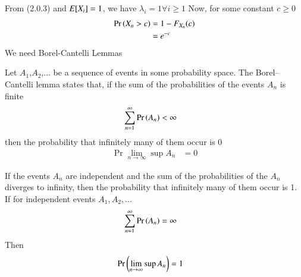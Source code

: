 \documentclass[journal,12pt,twocolumn]{IEEEtran}
\begin{document}
From (2.0.3) and $E[ X_i ]=1$, we have $\lambda_i=1 \forall  i \geq1$
Now, for some constant $c\geq0$
\begin{align}
    \Pr\left(X_n>c\right)&=1-F_{X_n}(c)\\
             &=e^{-c}
\end{align}
We need Borel-Cantelli Lemmas
\begin{lemma}\label{Lemma1}
Let $A_1$,$A_2$,... be a sequence of events in some probability space. The Borel–Cantelli lemma states that, if the sum of the probabilities of the events $A_n$ is finite
\begin{align}
    \sum_{n=1}^{\infty}\Pr\left(A_n\right)&<\infty
\end{align}
then the probability that infinitely many of them occur is 0
\begin{align}
    \Pr{\lim_{n \rightarrow \infty}\sup A_n}&=0
\end{align}
\end{lemma}
\begin{lemma}\label{Lemma2}
If the events $A_n$ are independent and the sum of the probabilities of the $A_n$ diverges to infinity, then the probability that infinitely many of them occur is 1.
If for independent events $A_1,A_2,...$
\begin{align}
    \sum_{n=1}^{\infty}\Pr\left(A_n\right)&=\infty
\end{align}
Then
\begin{align}
    \Pr\left(\lim_{n \rightarrow \infty}\sup A_n\right)&=1
\end{align}
\end{lemma}
\end{document}
